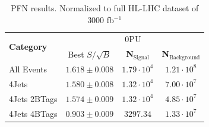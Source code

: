 \documentclass{article}
\begin{document}
\begin{table}[h!]
\centering

    \begin{tabular}{|l|c|c|c|} %
      \hline\hline
      \multirow{2}{*}{\textbf{Category}} & \multicolumn{3}{c|}{0PU}\\
      \cline{2-4}
      & Best $S/\sqrt{B}$ & \textbf{N$_{\mathrm{Signal}}$} & \textbf{N$_{\mathrm{Background}}$} \\
      \hline
      All Events & $1.618 \pm 0.008$ & $1.79\cdot 10^4$ & $1.21\cdot 10^8$ \\
      4Jets & $1.580 \pm 0.008$ & $1.32\cdot 10^4$ & $7.00\cdot 10^7$ \\
      4Jets 2BTags & $1.574 \pm 0.009$ & $1.32\cdot 10^4$ & $4.85\cdot 10^7$ \\
      4Jets 4BTags & $0.903 \pm 0.009$ & $3297.34$ & $1.33\cdot 10^7$ \\
      \hline\hline
    \end{tabular}
    \caption{PFN results. Normalized to full HL-LHC dataset of 3000 fb$^{-1}$}
\label{PFNtab}
\end{table}





\end{document}

